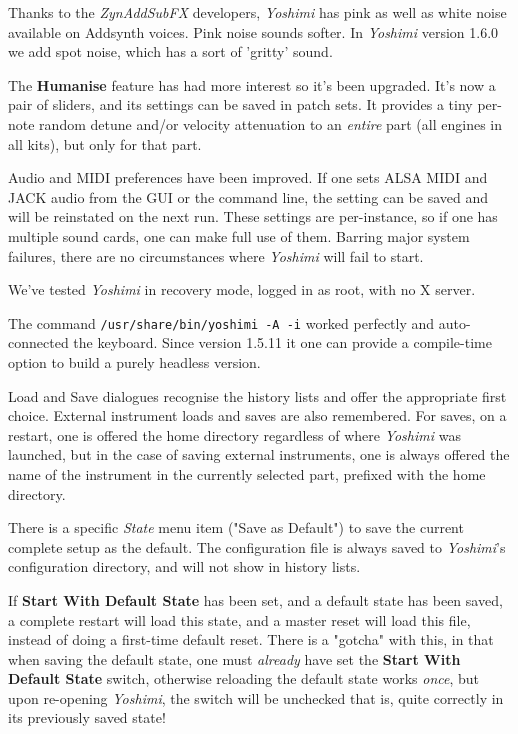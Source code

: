 \documentclass[
 11pt,
 twoside,
 a4paper,
 final                                 %
]{article}
\begin{document}
   Thanks to the \textsl{ZynAddSubFX} developers, \textsl{Yoshimi} has pink
   as well as white noise available on Addsynth voices. Pink noise sounds
   softer.  In \textsl{Yoshimi} version 1.6.0 we add spot noise, which has a
   sort of 'gritty' sound.

   The \textbf{Humanise} feature has had more interest so it's been upgraded.
   It's now a pair of sliders, and its settings can be saved in patch sets.
   It provides a tiny per-note random detune and/or velocity attenuation to an
   \textsl{entire} part (all engines in all kits), but only for that part.

   Audio and MIDI preferences have been improved. If one sets ALSA MIDI
   and JACK audio from the GUI or the command line, the setting can be
   saved and will be reinstated on the next run. These settings are
   per-instance, so if one has multiple sound cards, one can make full use of
   them.  Barring major system failures, there are no circumstances where
   \textsl{Yoshimi} will fail to start.

   We've tested \textsl{Yoshimi} in recovery mode, logged in as root, with
   no X server.

   The command \texttt{/usr/share/bin/yoshimi -A -i} worked perfectly and
   auto-connected the keyboard. Since version 1.5.11 it one can provide
   a compile-time option to build a purely headless version.

   Load and Save dialogues recognise the history lists and offer
   the appropriate first choice. External instrument loads and saves are
   also remembered.
   For saves, on a restart, one is offered the home directory regardless
   of where \textsl{Yoshimi} was launched, but in the case of saving
   external instruments, one is always offered the name of the instrument
   in the currently selected part, prefixed with the home directory.

   There is a specific \textsl{State} menu item ("Save as Default") to save
   the current complete setup as the default. The configuration file is always
   saved to \textsl{Yoshimi}'s configuration directory,
   and will not show in history lists.

   If \textbf{Start With Default State} has been set, and a
   default state has been saved, a complete restart will load this state,
   and a master reset will load this file, instead of doing a
   first-time default reset.
   There is a "gotcha" with this, in that when saving the default state,
   one must \textsl{already} have set the \textbf{Start With Default State}
   switch, otherwise reloading
   the default state works \textsl{once}, but upon re-opening
   \textsl{Yoshimi}, the switch will be
   unchecked \textemdash that is, quite correctly in its previously saved state!
\end{document}

